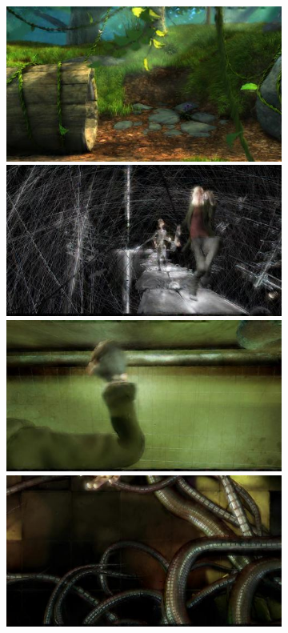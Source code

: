 \begin{figure}
\begin{subfigure}[t]{0.135\textwidth}
		\includegraphics[width=\textwidth]{figures/stereo/bbb_frame-0353-8}\\
		\includegraphics[width=\textwidth]{figures/stereo/ed_frame-0097-8}\\
		\includegraphics[width=\textwidth]{figures/stereo/ed_frame-0438-8}\\
		\includegraphics[width=\textwidth]{figures/stereo/ed_frame-0528-8}

\end{subfigure}
\end{figure}
